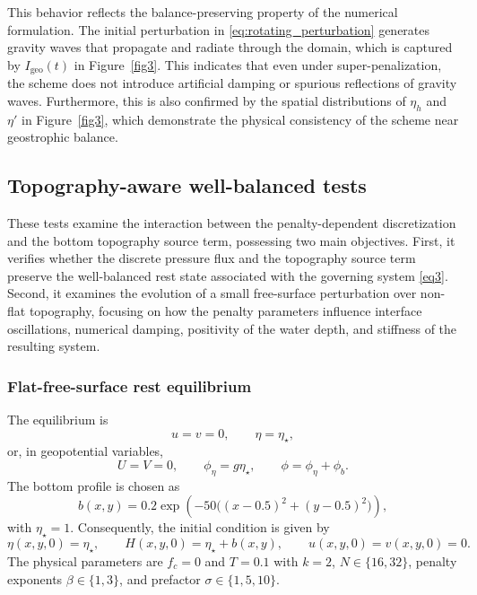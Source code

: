 \documentclass[pdflatex,sn-mathphys-num]{sn-jnl}%
\theoremstyle{thmstyleone}%
\theoremstyle{thmstyletwo}%
\theoremstyle{thmstylethree}%
\begin{document}
This behavior reflects the balance-preserving property of the numerical formulation. The initial perturbation in \eqref{eq:rotating_perturbation} generates gravity waves that propagate and radiate through the domain, which is captured by  $I_{\mathrm{geo}}(t)$ in Figure~\ref{fig3}. This indicates that even under super-penalization, the scheme does not introduce artificial damping or spurious reflections of gravity waves. Furthermore, this is also confirmed by the spatial distributions of $\eta_h$ and $\eta'$ in Figure~\ref{fig3}, which demonstrate the physical consistency of the scheme near geostrophic balance.

\subsection{Topography-aware well-balanced tests}
\label{sec:topography-tests}

These tests examine the interaction between the penalty-dependent discretization and the bottom topography source term, possessing two main objectives.
First, it verifies whether the discrete pressure flux and the topography source term preserve the well-balanced rest state associated with the 
governing system \eqref{eq3}. Second, it examines the evolution of a small free-surface perturbation over non-flat topography, focusing on how 
the penalty parameters influence interface oscillations, numerical damping, positivity of the water depth, and stiffness of the resulting system.

\subsubsection{Flat-free-surface rest equilibrium}

The equilibrium is
\begin{equation}
\label{eq:lake_at_rest}
u=v=0,\qquad \eta=\eta_\star,
\end{equation}
or, in geopotential variables,
\begin{equation}
\label{eq:lake_at_rest_geo}
U=V=0,\qquad \phi_\eta=g\eta_\star,\qquad \phi=\phi_\eta+\phi_b.
\end{equation}
The bottom profile is chosen as
\begin{equation}
\label{eq:topography_profile}
b(x,y)=0.2\exp\left(-50\bigl((x-0.5)^2+(y-0.5)^2\bigr)\right),
\end{equation}
with $\eta_\star=1$. Consequently, the initial condition is given by
\begin{equation}
\label{eq:lake_initial}
\eta(x,y,0)=\eta_\star,\qquad H(x,y,0)=\eta_\star+b(x,y),\qquad u(x,y,0)=v(x,y,0)=0.
\end{equation}
The physical parameters are $f_c=0$ and $T=0.1$ with $k=2$, $N \in \{16, 32\}$, penalty exponents $\beta \in \{1, 3\}$, and prefactor $\sigma \in \{1, 5, 10\}$.
\end{document}
